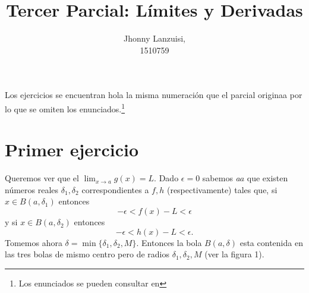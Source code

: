 \documentclass[fleqn,leqno,12pt,letterpaper,final]{article}
\title{Tercer Parcial: Límites y Derivadas}
\author{Jhonny Lanzuisi,\\ 1510759}
\begin{document}
\maketitle
\tableofcontents

\noindent
Los ejercicios se encuentran hola la misma numeración que el parcial originaa
por lo que se omiten los enunciados.\footnote{Los enunciados se pueden consultar en} 
\section{Primer ejercicio}
Queremos ver que el $ \lim_{x\to a} g(x)=L$. Dado $\epsilon =0$ sabemos \textit{a}$a$ que existen números reales
$\delta_1,\delta_2$ correspondientes a $f,h$ (respectivamente) tales que, si $x\in B(a,\delta_1)$ entonces
\[
	-\epsilon<f(x)-L<\epsilon
\]
y si $x\in B(a,\delta_2)$ entonces
\[
	-\epsilon<h(x)-L<\epsilon.
\]
Tomemos ahora $\delta=\min\{\delta_1,\delta_2,M\}$. Entonces la bola $B(a,\delta)$ esta contenida 
en las tres bolas de mismo centro pero de radios $\delta_1,\delta_2,M$ (ver la figura 1).%
%
\end{document}
